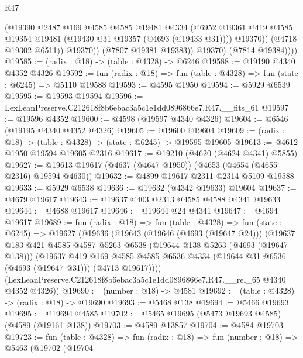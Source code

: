 \begin{lexlean}{R47}
\begin{coremodule}
                      (@19390
                        @2487
                        @169
                        @4585
                        @4585
                        @19481
                        @4334
                        (@6952
                          @19361
                          @419
                          @4585
                          @19354
                          @19481
                          (@19430 @31 @19357 (@4693 (@19433 @31))))
                        @19370))
                    (@4718 @19302 @6511))
                  @19370))
              (@7807 @19381 @19383))
            @19370)
          (@7814 @19384))))
@19585 := (radix : @18) -> (table : @4328) -> @6246
@19588 := @19190 @4340 @4352 @4326
@19592 := fun (radix : @18) => fun (table : @4328) => fun (state : @6245) => @5110 @19588
@19593 := @4595 @1950
@19594 := @5929 @6539
@19595 := @19593 @19594
@19596 := LexLeanPreserve.C212618f8b6ebac3a5c1e1dd0896866e7.R47.__fits_61
@19597 := @19596 @4352
@19600 := @4598 (@19597 @4340 @4326)
@19604 := @6546 (@19195 @4340 @4352 @4326)
@19605 := @19600 @19604
@19609 := (radix : @18) -> (table : @4328) -> (state : @6245) -> @19595 @19605
@19613 := @4612 @1950 @19594 @19605 @2316
@19617 := @19210 (@4620 (@4624 @4341) @5855)
@19627 := @19613 @19617 (@4637 (@4647 @1950)) (@4653 (@4654 (@4655 @2316) @19594 @4630))
@19632 := @4899 @19617 @2311 @2314 @5109 @19588
@19633 := @5929 @6538
@19636 := @19632 (@4342 @19633) @19604
@19637 := @4679 @19617
@19643 := @19637 @403 @2313 @4585 @4588 @4341 @19633
@19644 := @4688 @19617
@19646 := @19644 @24 @4341
@19647 := @4694 @19617
@19689 := fun (radix : @18) =>
  fun (table : @4328) =>
  fun (state : @6245) =>
  @19627
    (@19636
      (@19643
        (@19646 (@4693 (@19647 @24)))
        (@19637
          @183
          @421
          @4585
          @4587
          @5263
          @6538
          (@19644 @138 @5263 (@4693 (@19647 @138)))
          (@19637
            @419
            @169
            @4585
            @4585
            @6536
            @4334
            (@19644 @31 @6536 (@4693 (@19647 @31)))
            (@4713 @19617))))
      (LexLeanPreserve.C212618f8b6ebac3a5c1e1dd0896866e7.R47.__rel_65 @4340 @4352 @4326))
@19690 := (number : @18) -> @4581
@19692 := (table : @4328) -> (radix : @18) -> @19690
@19693 := @5468 @138
@19694 := @5466 @19693
@19695 := @19694 @4585
@19702 := @5465 @19695 (@5473 @19693 @4585) (@4589 (@19161 @138))
@19703 := @4589 @13857
@19704 := @4584 @19703
@19723 := fun (table : @4328) =>
  fun (radix : @18) =>
  fun (number : @18) =>
  @5463
    (@19702
      (@19704

\end{coremodule}
\end{lexlean}
